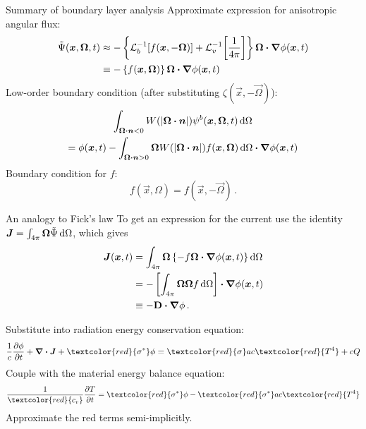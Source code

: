 \documentclass{beamer}
\begin{document}
\begin{frame}{Summary of boundary layer analysis}
  Approximate expression for anisotropic angular flux:
  \begin{align*}
    \tilde\Psi(\bm{x}, \bm{\Omega}, t)
    &\approx
    - \left\{ \mathcal{L}_{b}^{-1}\!\left[ f(\bm{x}, -\bm{\Omega}) \right]
    + \mathcal{L}_{v}^{-1}\!\left[ \frac1{4\pi} \right] \right\}
   \bm{\Omega}\bm{\cdot} \bm{\nabla} \phi(\bm{x},t)
    \\
    &\equiv -\left\{ f(\bm{x}, \bm{\Omega}) \right\}
    \bm{\Omega}\bm{\cdot} \bm{\nabla} \phi(\bm{x},t)
  \end{align*}
  Low-order boundary condition (after substituting $\zeta(\vec{x},
  -\vec{\Omega})$):
  \begin{multline*}
  \int_{\bm{\Omega}\bm{\cdot} \bm{n} < 0} W(\left| \bm{\Omega}\bm{\cdot} \bm{n} \right|)
  \psi^b(\bm{x},\bm{\Omega},t) \mathop{}\!\mathrm{d}\Omega
  \\ = \phi(\bm{x},t)
  - \int_{\bm{\Omega}\bm{\cdot} \bm{n} > 0} \bm{\Omega}
  W(\left| \bm{\Omega}\bm{\cdot} \bm{n} \right|) f(\bm{x},\bm{\Omega}) \mathop{}\!\mathrm{d}\Omega
  \bm{\cdot} \bm{\nabla} \phi(\bm{x},t)
  \end{multline*}
  Boundary condition for $f$:
  \begin{equation*}
    f(\vec{x}, \Omega) = f(\vec{x}, -\vec{\Omega})\,.
  \end{equation*}
\end{frame}

\begin{frame}{An analogy to Fick's law}
  To get an expression for the current use the
  identity
  $\bm{J} = \int_{4\pi}\bm{\Omega} \tilde \Psi \mathop{}\!\mathrm{d}\Omega$, which gives
  \begin{align*}
    \bm{J}(\bm{x}, t)
    &= \int_{4\pi}\bm{\Omega} \left\{
    -f \bm{\Omega}\bm{\cdot} \bm{\nabla} \phi(\bm{x},t) \right\} \mathop{}\!\mathrm{d}\Omega
    \\
    &= - \left[ \int_{4\pi}\bm{\Omega} \bm{\Omega} f \mathop{}\!\mathrm{d}\Omega\right]
    \bm{\cdot} \bm{\nabla} \phi(\bm{x},t) 
    \\
      &\equiv -\mathbf{D} \bm{\cdot} \bm{\nabla} \phi \,.
  \end{align*}

  Substitute into radiation energy conservation equation:
\begin{equation*}
  \frac{1}{c} \pder{\phi}{t}
  + \del \vd \vec{J} + \textcolor{red}{\sigma^*} \phi
  = \textcolor{red}{\sigma} ac\textcolor{red}{T^4}
  + c Q
\end{equation*}
Couple with the material energy balance equation:
\begin{equation*}
  \frac{1}{\textcolor{red}{c_v}}\pder{T}{t} = \textcolor{red}{\sigma^*} \phi -
  \textcolor{red}{\sigma^*} ac\textcolor{red}{T^4}
\end{equation*}
Approximate the red terms semi-implicitly.
\end{frame}
\end{document}

